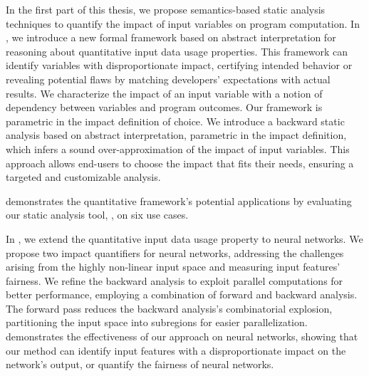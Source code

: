 In the first part of this thesis, we propose semantics-based static analysis techniques to quantify the impact of input variables on program computation.
In , we introduce a new formal framework based on abstract interpretation for reasoning about quantitative input data usage properties.
This framework can identify variables with disproportionate impact, certifying intended behavior or revealing potential flaws by matching developers' expectations with actual results.
We characterize the impact of an input variable with a notion of dependency between variables and program outcomes.
Our framework is parametric in the impact definition of choice.
%
We introduce a backward static analysis based on abstract interpretation, parametric in the impact definition, which infers a sound over-approximation of the impact of input variables.
This approach allows end-users to choose the impact that fits their needs, ensuring a targeted and customizable analysis.


 demonstrates the quantitative framework's potential applications by evaluating our static analysis tool, \impatto\sidenote{\label{intro:impatto}\impattourl}, on six use cases.


In , we extend the quantitative input data usage property to neural networks.
We propose two impact quantifiers for neural networks, addressing the challenges arising from the highly non-linear input space and measuring input features' fairness.
We refine the backward analysis to exploit parallel computations for better performance, employing a combination of forward and backward analysis.
The forward pass reduces the backward analysis's combinatorial explosion, partitioning the input space into subregions for easier parallelization.
 demonstrates the effectiveness of our approach on neural networks, showing that our method can identify input features with a disproportionate impact on the network's output, or quantify the fairness of neural networks.



